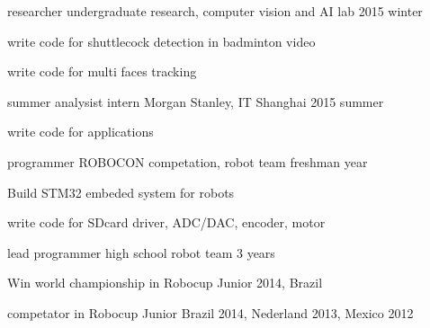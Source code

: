 \begin{cventries}
  \cventry
    {researcher} %
    {undergraduate research, computer vision and AI lab} %
    { } %
    {2015 winter} %
    {
      \begin{cvitems} %
        \item {write code for shuttlecock detection in badminton video}
        \item {write code for multi faces tracking}
      \end{cvitems}
    }

  \cventry
    {summer analysist intern} %
    {Morgan Stanley, IT} %
    {Shanghai} %
    {2015 summer} %
    {
      \begin{cvitems} %
        \item {write code for applications}
      \end{cvitems}
    }

  \cventry
    {programmer} %
    {ROBOCON competation, robot team} %
    { } %
    {freshman year} %
    {
      \begin{cvitems} %
        \item {Build STM32 embeded system for robots}
        \item {write code for SDcard driver, ADC/DAC, encoder, motor}
      \end{cvitems}
    }

  \cventry
    {lead programmer} %
    {high school robot team} %
    { } %
    {3 years} %
    {
      \begin{cvitems} %
        \item {Win world championship in Robocup Junior 2014, Brazil}
        \item {competator in Robocup Junior Brazil 2014, Nederland 2013, Mexico 2012}
      \end{cvitems}
    }

\end{cventries}
